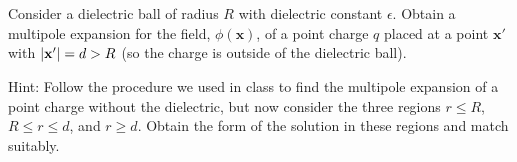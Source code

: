 \documentclass[11pt]{article}
\renewcommand{\vec}[1]{\mathbf{#1}}
\newenvironment{statement}[1]
{
	\section{#1}
	\color{darkgray}
	\ignorespaces
}
{
}
\begin{document}
\newcommand{\eps}{\epsilon}
\newcommand{\vx}{\vec{x}}
\newcommand{\phix}{\phi(\vx)}
\newcommand{\vp}{\vec{p}}
\newcommand{\dcx}{\dd[3]{x}}
\newcommand{\dcxp}{\dd[3]{x'}}
\newcommand{\rhox}{\rho(\vx)}
\newcommand{\rhoxp}{\rho(\vx')}
\newcommand{\xh}{\vec{\hat{x}}}
\newcommand{\absx}{\abs{\vx}}
\newcommand{\absxp}{\abs{\vx'}}

\newcommand{\Ylm}{Y_{l m}}
\newcommand{\qlm}{q_{l m}}
\newcommand{\Plm}{P_l^m}
\newcommand{\tht}{\theta}
\newcommand{\cost}{\cos\tht}
\newcommand{\vph}{\varphi}
\newcommand{\tv}{(\tht, \vph)}
\newcommand{\tvp}{(\tht', \vph')}
\newcommand{\Gxxp}{G(\vx, \vx')}
\newcommand{\qplm}{q'_{l m}}

\newcommand{\lap}{\nabla^2}
\newcommand{\evphi}{\ev{\phi}}
\newcommand{\rhof}{\rho_f}
\newcommand{\fe}{\frac{4\pi}{\eps}}

\begin{statement}{}
	Consider a dielectric ball of radius $R$ with dielectric constant $\eps$.  Obtain a multipole expansion for the field, $\phix$, of a point charge $q$ placed at a point $\vx'$ with $\abs{\vx'} = d > R$ (so the charge is outside of the dielectric ball).
	
	Hint: Follow the procedure we used in class to find the multipole expansion of a point charge without the dielectric, but now consider the three regions $r \leq R$, $R \leq r \leq d$, and $r \geq d$.  Obtain the form of the solution in these regions and match suitably.
\end{statement}
\end{document}
